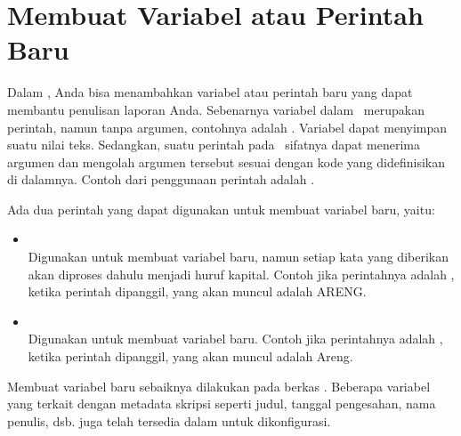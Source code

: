 \section{Membuat Variabel atau Perintah Baru}
\label{sec:newCommand}
Dalam \latex, Anda bisa menambahkan variabel atau perintah baru yang dapat membantu penulisan laporan Anda. Sebenarnya variabel dalam \latex~merupakan perintah, namun tanpa argumen, contohnya adalah . Variabel dapat menyimpan suatu nilai teks. Sedangkan, suatu perintah pada \latex~sifatnya dapat menerima argumen dan mengolah argumen tersebut sesuai dengan kode yang didefinisikan di dalamnya. Contoh dari penggunaan perintah adalah .

Ada dua perintah yang dapat digunakan untuk membuat variabel baru, yaitu:
\begin{itemize}
	\item {} \\
	Digunakan untuk membuat variabel baru, namun setiap kata yang diberikan akan diproses dahulu menjadi huruf kapital.
	Contoh jika perintahnya adalah , ketika perintah  dipanggil, yang akan muncul adalah ARENG.
	\item {} \\
	Digunakan untuk membuat variabel baru.
	Contoh jika perintahnya adalah , ketika perintah  dipanggil, yang akan muncul adalah Areng.
\end{itemize}

Membuat variabel baru sebaiknya dilakukan pada berkas . Beberapa variabel yang terkait dengan metadata skripsi seperti judul, tanggal pengesahan, nama penulis, dsb. juga telah tersedia dalam  untuk dikonfigurasi.

